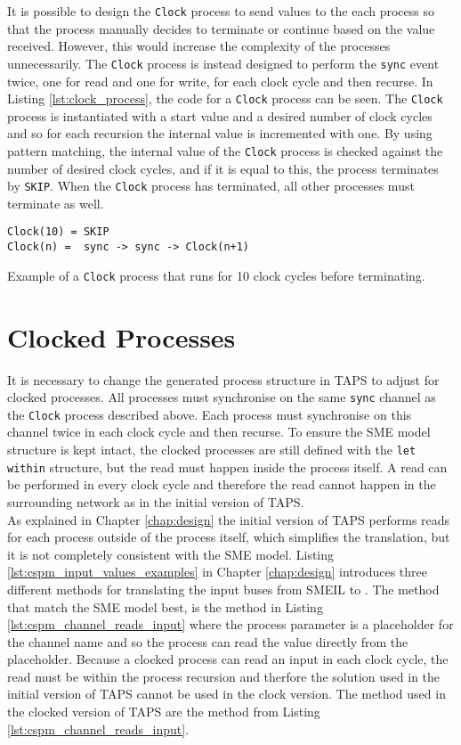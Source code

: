 It is possible to design the \texttt{Clock} process to send values to the each process so that the process manually decides to terminate or continue based on the value received. However, this would increase the complexity of the processes unnecessarily. The \texttt{Clock} process is instead designed to perform the \texttt{sync} event twice, one for read and one for write, for each clock cycle and then recurse. In Listing \ref{lst:clock_process}, the \cspm{} code for a \texttt{Clock} process can be seen. The \texttt{Clock} process is instantiated with a start value and a desired number of clock cycles and so for each recursion the internal value is incremented with one. By using pattern matching, the internal value of the \texttt{Clock} process is checked against the number of desired clock cycles, and if it is equal to this, the process terminates by \texttt{SKIP}. When the \texttt{Clock} process has terminated, all other processes must terminate as well.
\begin{listing}
\begin{verbatim}
Clock(10) = SKIP
Clock(n) =  sync -> sync -> Clock(n+1)
\end{verbatim}
\caption{Example of a \texttt{Clock} process that runs for 10 clock cycles before terminating. }
\label{lst:clock_process}
\end{listing}

\section{Clocked Processes}
It is necessary to change the generated \cspm{} process structure in TAPS to adjust for clocked processes. All processes must synchronise on the same \texttt{sync} channel as the \texttt{Clock} process described above. Each process must synchronise on this channel twice in each clock cycle and then recurse. To ensure the SME model structure is kept intact, the clocked processes are still defined with the \texttt{let within} structure, but the read must happen inside the process itself. A read can be performed in every clock cycle and therefore the read cannot happen in the surrounding network as in the initial version of TAPS.\\

As explained in Chapter \ref{chap:design} the initial version of TAPS performs reads for each process outside of the process itself, which simplifies the translation, but it is not completely consistent with the SME model. Listing \ref{lst:cspm_input_values_examples} in Chapter \ref{chap:design} introduces three different methods for translating the input buses from SMEIL to \cspm{}. The method that match the SME model best, is the method in Listing \ref{lst:cspm_channel_reads_input} where the process parameter is a placeholder for the channel name and so the process can read the value directly from the placeholder. Because a clocked process can read an input in each clock cycle, the read must be within the process recursion and therfore the solution used in the initial version of TAPS cannot be used in the clock version. The method used in the clocked version of TAPS are the method from Listing \ref{lst:cspm_channel_reads_input}.\\

